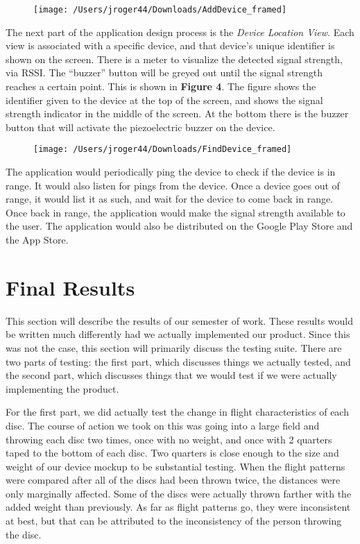 \documentclass[12pt]{article}
\begin{document}
\begin{figure}
\centering
\caption[Figure 3]{}
\texttt{[image: /Users/jroger44/Downloads/AddDevice\_framed]}
\label{fig:AddDevice_Framed}
\end{figure}

		The next part of the application design process is the \emph{Device Location View}. Each view is associated with a specific device, and that device's unique identifier is shown on the screen. There is a meter to visualize the detected signal strength, via RSSI. The ``buzzer'' button will be greyed out until the signal strength reaches a certain point. This is shown in \textbf{Figure 4}. The figure shows the identifier given to the device at the top of the screen, and shows the signal strength indicator in the middle of the screen. At the bottom there is the buzzer button that will activate the piezoelectric buzzer on the device. 

\begin{figure}
	\centering
	\caption[Figure 4]{}
	\texttt{[image: /Users/jroger44/Downloads/FindDevice\_framed]}
	\label{fig:FindDevice_Framed}
\end{figure}

	The application would periodically ping the device to check if the device is in range. It would also listen for pings from the device. Once a device goes out of range, it would list it as such, and wait for the device to come back in range. Once back in range, the application would make the signal strength available to the user. The application would also be distributed on the Google Play Store and the App Store.
	
	\section{Final Results}
	
	This section will describe the results of our semester of work. These results would be written much differently had we actually implemented our product. Since this was not the case, this section will primarily discuss the testing suite. There are two parts of testing: the first part, which discusses things we actually tested, and the second part, which discusses things that we would test if we were actually implementing the product. 
	
	For the first part, we did actually test the change in flight characteristics of each disc. The course of action we took on this was going into a large field and throwing each disc two times, once with no weight, and once with 2 quarters taped to the bottom of each disc. Two quarters is close enough to the size and weight of our device mockup to be substantial testing. When the flight patterns were compared after all of the discs had been thrown twice, the distances were only marginally affected. Some of the discs were actually thrown farther with the added weight than previously. As far as flight patterns go, they were inconsistent at best, but that can be attributed to the inconsistency of the person throwing the disc. 
	
\end{document}
